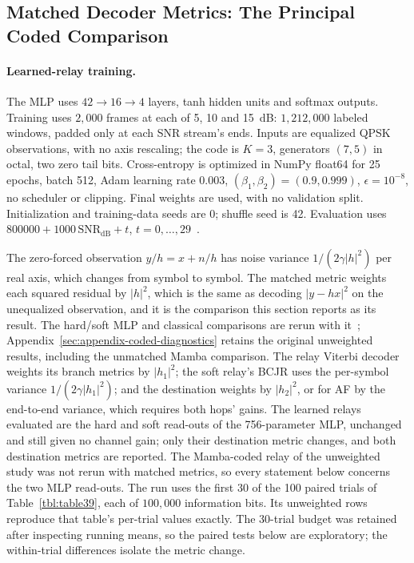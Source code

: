 \subsection{Matched Decoder Metrics: The Principal Coded Comparison}\label{sec:coded-matched-metrics}

\paragraph{Learned-relay training.} The MLP uses $42\to16\to4$ layers, tanh hidden units and softmax outputs. Training uses $2{,}000$ frames at each of 5, 10 and 15~dB: $1{,}212{,}000$ labeled windows, padded only at each SNR stream's ends. Inputs are equalized QPSK observations, with no axis rescaling; the code is $K=3$, generators $(7,5)$ in octal, two zero tail bits. Cross-entropy is optimized in NumPy float64 for 25 epochs, batch 512, Adam learning rate $0.003$, $(\beta_1,\beta_2)=(0.9,0.999)$, $\epsilon=10^{-8}$, no scheduler or clipping. Final weights are used, with no validation split. Initialization and training-data seeds are 0; shuffle seed is 42. Evaluation uses $800000+1000\,\mathrm{SNR}_{\mathrm{dB}}+t$, $t=0,\ldots,29$~.

The zero-forced observation $y/h = x + n/h$ has noise variance $1/(2\gamma|h|^{2})$ per real axis, which changes from symbol to symbol. The matched metric weights each squared residual by $|h|^{2}$, which is the same as decoding $|y - hx|^{2}$ on the unequalized observation, and it is the comparison this section reports as its result. The hard/soft MLP and classical comparisons are rerun with it~; Appendix~\ref{sec:appendix-coded-diagnostics} retains the original unweighted results, including the unmatched Mamba comparison. The relay Viterbi decoder weights its branch metrics by $|h_1|^{2}$; the soft relay's BCJR uses the per-symbol variance $1/(2\gamma|h_1|^{2})$; and the destination weights by $|h_2|^{2}$, or for AF by the end-to-end variance, which requires both hops' gains. The learned relays evaluated are the hard and soft read-outs of the 756-parameter MLP, unchanged and still given no channel gain; only their destination metric changes, and both destination metrics are reported. The Mamba-coded relay of the unweighted study was not rerun with matched metrics, so every statement below concerns the two MLP read-outs. The run uses the first 30 of the 100 paired trials of Table~\ref{tbl:table39}, each of $100{,}000$ information bits. Its unweighted rows reproduce that table's per-trial values exactly. The 30-trial budget was retained after inspecting running means, so the paired tests below are exploratory; the within-trial differences isolate the metric change.

